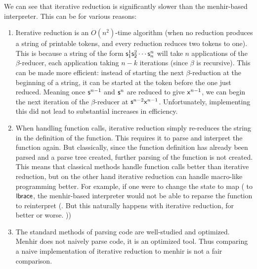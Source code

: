 \documentclass{llncs}
\newcounter{algo}
\begin{document}
We can see that iterative reduction is significantly slower than the menhir-based interpreter.
This can be for various reasons:
\begin{enumerate}
    \item Iterative reduction is an $O(n^2)$-time algorithm (when no reduction produces a string of printable tokens, and every reduction reduces two tokens to one).
        This is because a string of the form $\mathsf{s}^1_1\mathsf{s}^2_2\cdots\mathsf{s}^n_n$ will take $n$ applications of the $\beta$-reducer, each application taking $n-k$ iterations (since $\beta$ is recursive).
        This can be made more efficient: instead of starting the next $\beta$-reduction at the beginning of a string, it can be started at the token before the one just reduced.
        Meaning once $\mathsf{s}^{n-1}$ and $\mathsf{s}^n$ are reduced to give $\mathsf{x}^{n-1}$, we can begin the next iteration of the $\beta$-reducer at $\mathsf{s}^{n-2}\mathsf{x}^{n-1}$.
        Unfortunately, implementing this did not lead to substantial increases in efficiency.

    \item When handling function calls, iterative reduction simply re-reduces the string in the definition of the function.
        This requires it to parse and interpret the function again.
        But classically, since the function definition has already been parsed and a parse tree created, further parsing of the function is not created.
        This means that classical methods handle function calls better than iterative reduction, but on the other hand iterative reduction can handle macro-like programming better.
        For example, if one were to change the state to map \ttt( to $\textsf{lbrace}$, the menhir-based interpreter would not be able to reparse the function to reinterpret \ttt(.
        But this naturally happens with iterative reduction, for better or worse.
        \gobble)\gobble)

    \item The standard methods of parsing code are well-studied and optimized.
        Menhir does not naively parse code, it is an optimized tool.
        Thus comparing a naive implementation of iterative reduction to menhir is not a fair comparison.
\end{enumerate}




\end{document}
